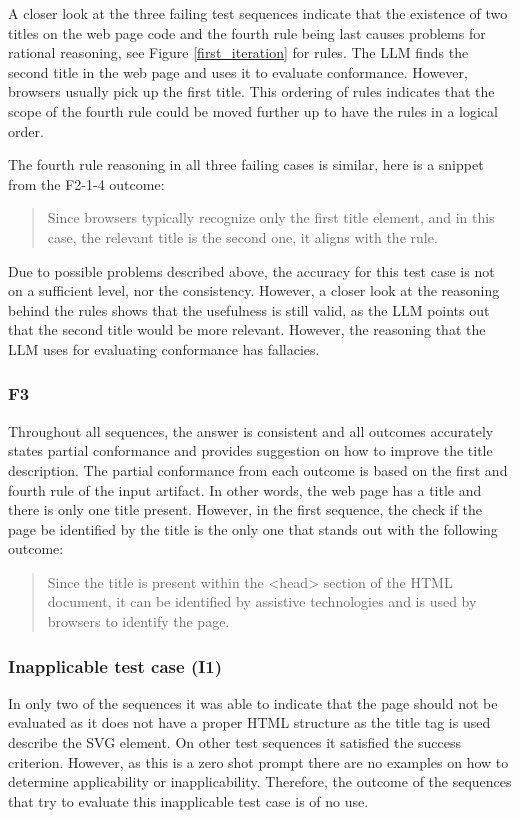 A closer look at the three failing test sequences indicate that the existence of two titles on the web page code and the fourth rule being last causes problems for rational reasoning, see Figure \ref{first_iteration} for rules. The LLM finds the second title in the web page and uses it to evaluate conformance. However, browsers usually pick up the first title. This ordering of rules indicates that the scope of the fourth rule could be moved further up to have the rules in a logical order.

The fourth rule reasoning in all three failing cases is similar, here is a snippet from the F2-1-4 outcome: \blockquote{Since browsers typically recognize only the first title element, and in this case, the relevant title is the second one, it aligns with the rule.}

Due to possible problems described above, the accuracy for this test case is not on a sufficient level, nor the consistency. However, a closer look at the reasoning behind the rules shows that the usefulness is still valid, as the LLM points out that the second title would be more relevant. However, the reasoning that the LLM uses for evaluating conformance has fallacies.

\subsubsection{F3}

Throughout all sequences, the answer is consistent and all outcomes accurately states partial conformance and provides suggestion on how to improve the title description. The partial conformance from each outcome is based on the first and fourth rule of the input artifact. In other words, the web page has a title and there is only one title present. However, in the first sequence, the check if the page be identified by the title is the only one that stands out with the following outcome: \blockquote{Since the title is present within the <head> section of the HTML document, it can be identified by assistive technologies and is used by browsers to identify the page.}

\subsubsection{Inapplicable test case (I1)}

In only two of the sequences it was able to indicate that the page should not be evaluated as it does not have a proper HTML structure as the title tag is used describe the SVG element. On other test sequences it satisfied the success criterion. However, as this is a zero shot prompt there are no examples on how to determine applicability or inapplicability. Therefore, the outcome of the sequences that try to evaluate this inapplicable test case is of no use.

